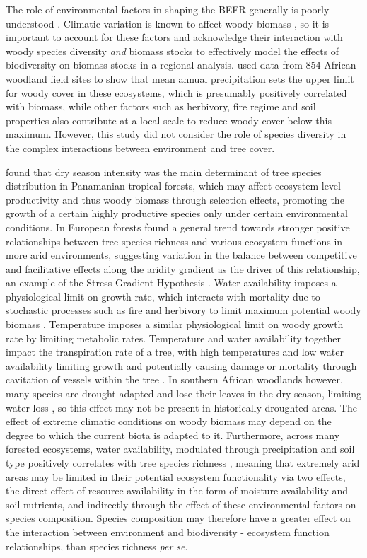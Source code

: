 \documentclass[11pt,a4paper]{article}
\begin{document}
The role of environmental factors in shaping the BEFR generally is poorly understood \citep{Ratcliffe2017}. Climatic variation is known to affect woody biomass \citep{Michaletz2014}, so it is important to account for these factors and acknowledge their interaction with woody species diversity \textit{and} biomass stocks to effectively model the effects of biodiversity on biomass stocks in a regional analysis. \citet{Sankaran2005} used data from 854 African woodland field sites to show that mean annual precipitation sets the upper limit for woody cover in these ecosystems, which is presumably positively correlated with biomass, while other factors such as herbivory, fire regime and soil properties also contribute at a local scale to reduce woody cover below this maximum. However, this study did not consider the role of species diversity in the complex interactions between environment and tree cover. 

\citet{Condit2013} found that dry season intensity was the main determinant of tree species distribution in Panamanian tropical forests, which may affect ecosystem level productivity and thus woody biomass through selection effects, promoting the growth of a certain highly productive species only under certain environmental conditions. In European forests \citep{Ratcliffe2017} found a general trend towards stronger positive relationships between tree species richness and various ecosystem functions in more arid environments, suggesting variation in the balance between competitive and facilitative effects along the aridity gradient as the driver of this relationship, an example of the Stress Gradient Hypothesis \citep{Dohn2013}. Water availability imposes a physiological limit on growth rate, which interacts with mortality due to stochastic processes such as fire and herbivory to limit maximum potential woody biomass \citep{}. Temperature imposes a similar physiological limit on woody growth rate by limiting metabolic rates. Temperature and water availability together impact the transpiration rate of a tree, with high temperatures and low water availability limiting growth and potentially causing damage or mortality through cavitation of vessels within the tree \citep{Rowland2015a, Fensham2009}. In southern African woodlands however, many species are drought adapted and lose their leaves in the dry season, limiting water loss \citep{Solbrig1996}, so this effect may not be present in historically droughted areas. The effect of extreme climatic conditions on woody biomass may depend on the degree to which the current biota is adapted to it. Furthermore, across many forested ecosystems, water availability, modulated through precipitation and soil type positively correlates with tree species richness \citep{Vila2005}, meaning that extremely arid areas may be limited in their potential ecosystem functionality via two effects, the direct effect of resource availability in the form of moisture availability and soil nutrients, and indirectly through the effect of these environmental factors on species composition. Species composition may therefore have a greater effect on the interaction between environment and biodiversity - ecosystem function relationships, than species richness \textit{per se}.
\end{document}
